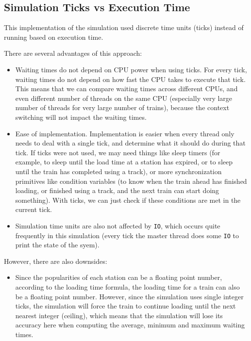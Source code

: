 \documentclass[12pt]{article}
\begin{document}
\subsection{Simulation Ticks vs Execution Time}

This implementation of the simulation used discrete time units (ticks) instead of running based on execution time.

\bigbreak \noindent There are several advantages of this approach:
\begin{itemize}
	\item Waiting times do not depend on CPU power when using ticks. For every tick, waiting times do not depend on how fast the CPU takes to execute that tick. This means that we can compare waiting times across different CPUs, and even different number of threads on the same CPU (especially very large number of threads for very large number of trains), because the context switching will not impact the waiting times.
	\item Ease of implementation. Implementation is easier when every thread only needs to deal with a single tick, and determine what it should do during that tick. If ticks were not used, we may need things like sleep timers (for example, to sleep until the load time at a station has expired, or to sleep until the train has completed using a track), or more synchronization primitives like condition variables (to know when the train ahead has finished loading, or finished using a track, and the next train can start doing something). With ticks, we can just check if these conditions are met in the current tick.
	\item Simulation time units are also not affected by \verb!IO!, which occurs quite frequently in this simulation (every tick the master thread does some \verb!IO! to print the state of the syem).
\end{itemize}

\bigbreak \noindent However, there are also downsides:
\begin{itemize}
	\item Since the popularities of each station can be a floating point number, according to the loading time formula, the loading time for a train can also be a floating point number. However, since the simulation uses single integer ticks, the simulation will force the train to continue loading until the next nearest integer (ceiling), which means that the simulation will lose its accuracy here when computing the average, minimum and maximum waiting times.
\end{itemize}
\end{document}
